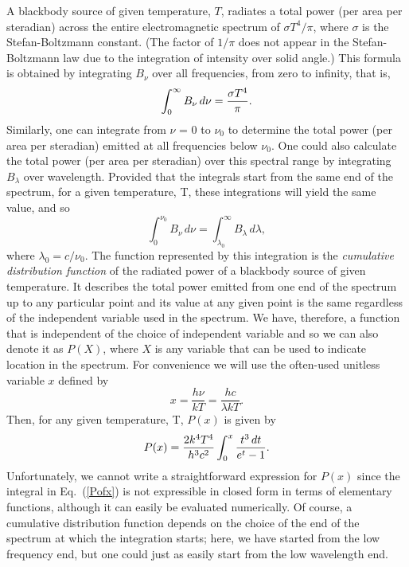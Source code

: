 \documentclass[12pt,aps,prb,preprint]{revtex4}   %
\begin{document}
A blackbody source of given temperature, $T$, radiates a total power (per area per steradian) across the entire electromagnetic spectrum of $\sigma T^4 / \pi$, where $\sigma$ is the Stefan-Boltzmann constant. (The factor of $1 / \pi$ does not appear in the Stefan-Boltzmann law due to the integration of intensity over solid angle.\cite{Gray})  This formula is obtained by integrating $B_\nu$ over all frequencies, from zero to infinity, that is,
\begin{equation}
\label{intBnu}
\int_{0}^{\infty}{B_\nu \,d\nu} = {\sigma T^4 \over \pi}.
\end{equation}
Similarly, one can integrate from $\nu$ = 0 to $\nu_0$ to
determine the total power (per area per steradian) emitted at all frequencies below $\nu_0$.
One could also calculate the total power (per area per steradian) over this spectral range by integrating $B_\lambda$ over wavelength.  Provided that the integrals start from the same end of the spectrum, for a given temperature, T, these integrations will yield the same value, and so
\begin{equation}
\label{PlambdaEqPnu}
\int_{0}^{\nu_0}{B_\nu \,d\nu} = \int_{\lambda_0}^{\infty}{B_\lambda \,d\lambda},
\end{equation}
where $\lambda_0 = c / \nu_0$.  The function represented by this integration is the
{\it cumulative distribution function} of the radiated power of a blackbody source of given temperature.  It describes the total power emitted from one end of the spectrum up to any particular point and its value at any given
point is the same regardless of the independent variable used in the spectrum.  
We have, therefore, a function that is independent of the choice of independent variable and so we can also denote it as $P(X)$, where $X$ is any variable that can be used to indicate location in the spectrum.  
For convenience we will use the often-used unitless variable $x$ defined by
\begin{equation}
\label{xeq}
x = \frac{h\nu}{kT} = \frac{hc}{\lambda kT}.
\end{equation}
Then, for any given temperature, T, $P(x)$ is given by
\begin{equation}
\label{Pofx}
P(x) = {2k^4T^4 \over h^3c^2}\int_{0}^x{{t^3\,dt \over e^{t}-1}}.
\end{equation}
Unfortunately, we cannot write a straightforward expression for $P(x)$ since
the integral in Eq.~(\ref{Pofx}) is not expressible in closed form in terms of elementary functions, although it can easily be evaluated numerically.\cite{Pavelle,Stewart}
Of course, a cumulative distribution function depends on the choice of the end of the spectrum at which the integration starts; here, we have started from the low frequency end, but one could just as easily start from the low wavelength end.  
\end{document}
